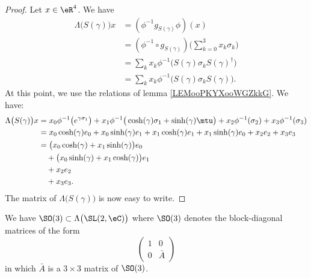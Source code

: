 \begin{proof}
	Let \( x\in \eR^4\). We have
	\begin{subequations}
		\begin{align}
			\Lambda\big( S(\gamma) \big)x & =(\phi^{-1}g_{S(\gamma)}\phi)(x)                                   \\
			                              & =(\phi^{-1}\circ g_{S(\gamma)})\big( \sum_{k=0}^3x_k\sigma_k \big) \\
			                              & =\sum_kx_k\phi^{-1}\big( S(\gamma)\sigma_kS(\gamma)^{\dag} \big)   \\
			                              & =\sum_kx_k\phi^{-1}\big( S(\gamma)\sigma_kS(\gamma) \big).
		\end{align}
	\end{subequations}
	At this point, we use the relations of lemma \ref{LEMooPKYXooWGZkkG}. We have:
	\begin{subequations}
		\begin{align}
			\Lambda\big( S(\gamma) \big)x & =x_0\phi^{-1}\big(  e^{\gamma\sigma_1} \big)+x_1\phi^{-1}\big( \cosh(\gamma)\sigma_1+\sinh(\gamma)\mtu \big)
			+x_2\phi^{-1}(\sigma_2)+x_3\phi^{-1}(\sigma_3)                                                                                               \\
			                              & =x_0\cosh(\gamma)e_0+x_0\sinh(\gamma)e_1+x_1\cosh(\gamma)e_1+x_1\sinh(\gamma)e_0+x_2e_2+x_3e_3               \\
			                              & =\big( x_0\cosh(\gamma)+x_1\sinh(\gamma) \big)e_0                                                            \\
			                              & \quad+\big( x_0\sinh(\gamma)+x_1\cosh(\gamma) \big)e_1                                                       \\
			                              & \quad+x_2e_2                                                                                                 \\
			                              & \quad+x_3e_3.
		\end{align}
	\end{subequations}
	The matrix of \( \Lambda\big( S(\gamma) \big)\) is now easy to write.
\end{proof}

\begin{lemma}       \label{LEMooTZPAooWGjMgU}
	We have \( \SO(3)\subset \Lambda\big( \SL(2,\eC) \big)\) where \( \SO(3)\) denotes the block-diagonal matrices of the form
	\begin{equation}
		\begin{pmatrix}
			1 & 0      \\
			0 & \bar A
		\end{pmatrix}
	\end{equation}
	in which \( \bar A\) is a \( 3\times 3\) matrix of \( \SO(3)\).
\end{lemma}

